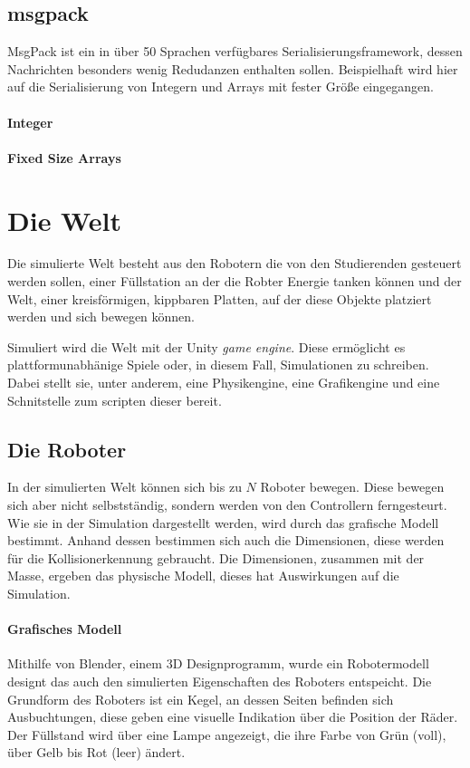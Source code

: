 \documentclass[
    12pt,
    bibliography=totoc,
    ngerman
]{scrartcl}
\begin{document}
\subsection{msgpack}
MsgPack ist ein in {\"{u}}ber 50 Sprachen verf{\"{u}}gbares Serialisierungsframework, dessen Nachrichten besonders wenig Redudanzen enthalten sollen. Beispielhaft wird hier auf die Serialisierung von
Integern und Arrays mit fester Gr{\"{o}}{\ss}e eingegangen.

\paragraph{Integer}
\paragraph{Fixed Size Arrays}

\clearpage
\section{Die Welt}
Die simulierte Welt besteht aus den Robotern die von den Studierenden gesteuert werden sollen, einer F{\"{u}}llstation an der die Robter Energie tanken k{\"{o}}nnen und
der Welt, einer kreisf{\"{o}}rmigen, kippbaren Platten, auf der diese Objekte platziert werden und sich bewegen k{\"{o}}nnen.

Simuliert wird die Welt mit der Unity \textit{game engine}. Diese erm{\"{o}}glicht es plattformunabh{\"{a}}nige Spiele oder, in diesem Fall, Simulationen zu schreiben.
Dabei stellt sie, unter anderem, eine Physikengine, eine Grafikengine und eine Schnitstelle zum scripten dieser bereit. 

\subsection{Die Roboter}\label{robot}
In der simulierten Welt k{\"{o}}nnen sich bis zu $N$ Roboter bewegen. Diese bewegen sich aber nicht selbstst{\"{a}}ndig, sondern werden von den Controllern ferngesteurt.
Wie sie in der Simulation dargestellt werden, wird durch das grafische Modell bestimmt. Anhand dessen bestimmen sich auch die Dimensionen, diese werden f{\"{u}}r die Kollisionerkennung
gebraucht. Die Dimensionen, zusammen mit der Masse, ergeben das physische Modell, dieses hat Auswirkungen auf die Simulation.

\paragraph{Grafisches Modell} Mithilfe von Blender, einem 3D Designprogramm, wurde ein Robotermodell designt das auch den simulierten Eigenschaften des Roboters entspeicht. Die Grundform des Roboters ist
ein Kegel, an dessen Seiten befinden sich Ausbuchtungen, diese geben eine visuelle Indikation {\"{u}}ber die Position der R{\"{a}}der. Der F{\"{u}}llstand wird {\"{u}}ber eine Lampe angezeigt, die ihre
Farbe von Gr{\"{u}}n (voll), {\"{u}}ber Gelb bis Rot (leer) {\"{a}}ndert.
\end{document}
